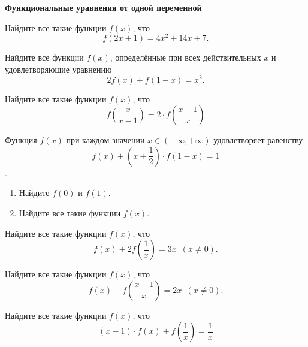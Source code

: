 \documentclass{article}
\begin{document}
    \large


    \begin{center}
        \textbf{Функциональные уравнения от одной переменной}
    \end{center}

    \begin{enumerate_boxed}

        \item Найдите все такие функции $f(x)$, что
        \[f(2x+1) = 4x^2 +14x+7.\]

        \item Найдите все функции $f(x)$, определённые при всех действительных $x$ и удовлетворяющие уравнению
        \[2f(x) + f(1 - x) = x^2.\]

        \item Найдите все такие функции $f(x)$, что
        \[f\left(\frac{x}{x-1}\right) = 2 \cdot f\left(\frac{x-1}{x}\right)\]

        \item Функция $f(x)$ при каждом значении $x \in (-\infty,+\infty)$ удовлетворяет равенству
        \[f(x)+ \left( x+\frac{1}{2}\right) \cdot f(1-x)=1\].
        \begin{enumerate}
            \item Найдите $f(0)$ и $f(1)$.

            \item Найдите все такие функции $f(x)$.
        \end{enumerate}

        \item Найдите все такие функции $f(x)$, что
        \[f(x)+2f\left(\frac{1}{x}\right) =3x \,\,\, (x \neq 0).\]

        \item Найдите все такие функции $f(x)$, что
        \[f(x) + f\left(\frac{x - 1}{x}\right) = 2x \,\,\, (x \neq  0).\]

        \item Найдите все такие функции $f(x)$, что
        \[(x - 1) \cdot f(x) + f\left(\frac{1}{x}\right) = \frac{1}{x} \]

    \end{enumerate_boxed}
\end{document}
